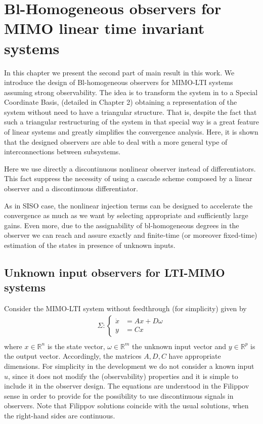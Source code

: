 \documentclass[11pt,letterpaper,twoside,openright]{report}
\newcommand{\RE}{\mathbb{R}}
\begin{document}
	\chapter{Bl-Homogeneous observers for MIMO linear time invariant systems}
	In this chapter we present the second part of main result in this work. We introduce the design of Bl-homogeneous observers for MIMO-LTI systems assuming strong observability. The idea is to transform the system in to a Special Coordinate Basis, (detailed in Chapter 2) obtaining a representation of the system without need to have a triangular structure. That is, despite the fact that such a triangular restructuring of the system in that special way is a great feature of linear systems and greatly simplifies the convergence analysis. Here, it is shown that the designed observers are able to deal with a more general type of interconnections between subsystems. 
	
	Here we use directly a discontinuous nonlinear observer instead of differentiators. This fact suppress the necessity of using a cascade scheme composed by a linear observer and a discontinuous differentiator.
	
	As in SISO case, the nonlinear injection terms can be designed to accelerate the convergence as much as we want by selecting appropriate and sufficiently large gains. Even more, due to the assignability of bl-homogeneous degrees in the observer we can reach and assure exactly and finite-time (or moreover fixed-time) estimation of the states in presence of unknown inputs.
	
\section{Unknown input observers for LTI-MIMO systems}
Consider the MIMO-LTI system without feedthrough (for simplicity) given by
\begin{equation}
	\begin{split}\label{ecu: CH4 Sys MIMO orig}
	\Sigma: \left\{
	\begin{array}{rl}
		\dot{x} &= Ax + D\omega\\
		y&=Cx
	\end{array}
	\right. \\
	\end{split}
\end{equation}
where $x \in \RE^n$ is the state vector, $\omega \in \RE^m$ the unknown input vector and $y \in \RE^p$ is the output vector. Accordingly, the matrices $A,D,C$ have appropriate dimensions. For simplicity in the development we do not consider a known input $u$, since it does not modify the (observability) properties and it is simple to include it in the observer design. The equations are understood in the Filippov sense \cite{Filipov1988} in order to provide for the possibility to use discontinuous signals in observers. Note that Filippov solutions coincide with the usual solutions, when the right-hand sides are continuous.
\end{document}
